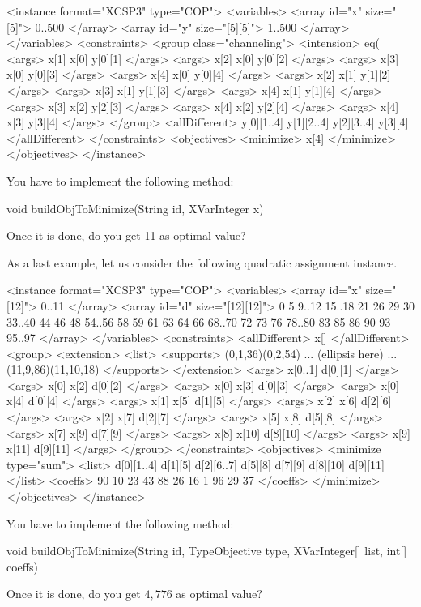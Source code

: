 \documentclass[10pt]{article}
\newenvironment{boxabsc}
               {\medskip \begin{bclogo}[barre=none,arrondi=0.2,logo=]{}\vspace{-0.6cm}}
               {\vspace{-0.1cm}\end{bclogo} \smallskip}
\begin{document}
\begin{boxabsc}
\begin{absc}
<instance format="XCSP3" type="COP">
  <variables>
    <array id="x" size="[5]"> 0..500 </array>
    <array id="y" size="[5][5]"> 1..500 </array>
  </variables>
  <constraints>
    <group class="channeling">
      <intension> eq(%
      <args> x[1] x[0] y[0][1] </args>
      <args> x[2] x[0] y[0][2] </args>
      <args> x[3] x[0] y[0][3] </args>
      <args> x[4] x[0] y[0][4] </args>
      <args> x[2] x[1] y[1][2] </args>
      <args> x[3] x[1] y[1][3] </args>
      <args> x[4] x[1] y[1][4] </args>
      <args> x[3] x[2] y[2][3] </args>
      <args> x[4] x[2] y[2][4] </args>
      <args> x[4] x[3] y[3][4] </args>
    </group>
    <allDifferent> y[0][1..4] y[1][2..4] y[2][3..4] y[3][4] </allDifferent>
  </constraints>
  <objectives>
    <minimize> x[4] </minimize>
  </objectives>
</instance>
\end{absc} 
\end{boxabsc}


You have to implement the following method:

\begin{boxabsc}
\begin{absc}
void buildObjToMinimize(String id, XVarInteger x) 
\end{absc} 
\end{boxabsc}

Once it is done, do you get 11 as optimal value?

As a last example, let us consider the following quadratic assignment instance.

\begin{boxabsc}
\begin{absc}
<instance format="XCSP3" type="COP">
  <variables>
    <array id="x" size="[12]"> 0..11 </array>
    <array id="d" size="[12][12]"> 0 5 9..12 15..18 21 26 29 30 33..40 44 46 48 54..56 58 59 61 63 64 66 68..70 72 73 76 78..80 83 85 86 90 93 95..97 </array>
  </variables>
  <constraints>
    <allDifferent> x[] </allDifferent>
    <group>
      <extension>
        <list> %
        <supports> (0,1,36)(0,2,54) ... (ellipsis here) ... (11,9,86)(11,10,18) </supports>
      </extension>
      <args> x[0..1] d[0][1] </args>
      <args> x[0] x[2] d[0][2] </args>
      <args> x[0] x[3] d[0][3] </args>
      <args> x[0] x[4] d[0][4] </args>
      <args> x[1] x[5] d[1][5] </args>
      <args> x[2] x[6] d[2][6] </args>
      <args> x[2] x[7] d[2][7] </args>
      <args> x[5] x[8] d[5][8] </args>
      <args> x[7] x[9] d[7][9] </args>
      <args> x[8] x[10] d[8][10] </args>
      <args> x[9] x[11] d[9][11] </args>
    </group>
  </constraints>
  <objectives>
    <minimize type="sum">
      <list> d[0][1..4] d[1][5] d[2][6..7] d[5][8] d[7][9] d[8][10] d[9][11] </list>
      <coeffs> 90 10 23 43 88 26 16 1 96 29 37 </coeffs>
    </minimize>
  </objectives>
</instance>
\end{absc} 
\end{boxabsc}

You have to implement the following method:

\begin{boxabsc}
\begin{absc}
void buildObjToMinimize(String id, TypeObjective type, XVarInteger[] list, int[] coeffs) 
\end{absc} 
\end{boxabsc}

Once it is done, do you get $4,776$ as optimal value?
\end{document}

